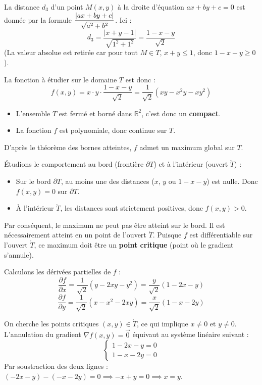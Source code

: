 \begin{exemple}
    La distance $d_3$ d'un point $M(x,y)$ à la droite d'équation $ax+by+c=0$ est donnée par la formule $\displaystyle \frac{|ax+by+c|}{\sqrt{a^2+b^2}}$. Ici :
    \[
    d_3 = \frac{|x+y-1|}{\sqrt{1^2+1^2}} = \frac{1-x-y}{\sqrt{2}}
    \]
    (La valeur absolue est retirée car pour tout $M \in T$, $x+y \le 1$, donc $1-x-y \ge 0$).

    La fonction à étudier sur le domaine $T$ est donc :
    \[
    f(x,y) = x \cdot y \cdot \frac{1-x-y}{\sqrt{2}} = \frac{1}{\sqrt{2}} (xy - x^2y - xy^2)
    \]


    \svspace \begin{itemize}
        \item L'ensemble $T$ est fermé et borné dans $\mathbb{R}^2$, c'est donc un \textbf{compact}.
        \item La fonction $f$ est polynomiale, donc continue sur $T$.
    \end{itemize}
    D'après le théorème des bornes atteintes, $f$ admet un maximum global sur $T$.

    Étudions le comportement au bord (frontière $\partial T$) et à l'intérieur (ouvert $\mathring{T}$) :
    \begin{itemize}
        \item Sur le bord $\partial T$, au moins une des distances ($x$, $y$ ou $1-x-y$) est nulle. Donc $f(x,y) = 0$ sur $\partial T$.
        \item À l'intérieur $\mathring{T}$, les distances sont strictement positives, donc $f(x,y) > 0$.
    \end{itemize}
    Par conséquent, le maximum ne peut pas être atteint sur le bord. Il est nécessairement atteint en un point de l'ouvert $\mathring{T}$.
    Puisque $f$ est différentiable sur l'ouvert $\mathring{T}$, ce maximum doit être un \textbf{point critique} (point où le gradient s'annule).


    \svspace Calculons les dérivées partielles de $f$ :
    \[
    \frac{\partial f}{\partial x} = \frac{1}{\sqrt{2}} (y - 2xy - y^2) = \frac{y}{\sqrt{2}} (1 - 2x - y)
    \]
    \[
    \frac{\partial f}{\partial y} = \frac{1}{\sqrt{2}} (x - x^2 - 2xy) = \frac{x}{\sqrt{2}} (1 - x - 2y)
    \]

    On cherche les points critiques $(x,y) \in \mathring{T}$, ce qui implique $x \neq 0$ et $y \neq 0$. L'annulation du gradient $\nabla f(x,y) = \vec{0}$ équivaut au système linéaire suivant :
    \[
    \begin{cases}
    1 - 2x - y = 0 \\
    1 - x - 2y = 0
    \end{cases}
    \]
    Par soustraction des deux lignes : $(-2x - y) - (-x - 2y) = 0 \implies -x + y = 0 \implies x = y$.


\end{exemple}
